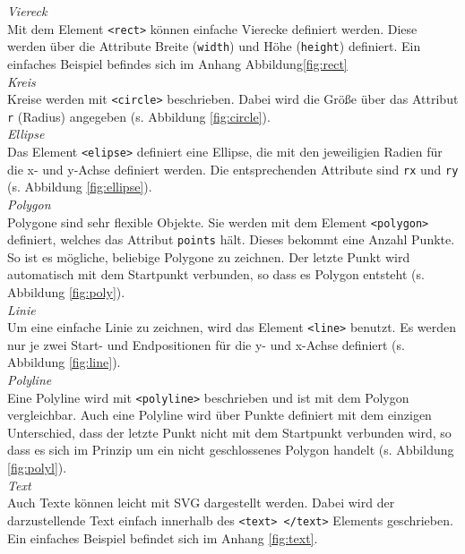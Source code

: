 \emph{Viereck}\\
Mit dem Element \texttt{<rect>} können einfache Vierecke definiert werden. Diese werden über die Attribute Breite (\texttt{width}) und Höhe (\texttt{height}) definiert. Ein einfaches Beispiel befindes sich im Anhang Abbildung\ref{fig:rect}\\

\emph{Kreis}\\
Kreise werden mit \texttt{<circle>} beschrieben. Dabei wird die Größe über das Attribut \texttt{r} (Radius) angegeben (s. Abbildung \ref{fig:circle}).\\

\emph{Ellipse}\\
Das Element \texttt{<elipse>} definiert eine Ellipse, die mit den jeweiligien Radien für die x- und y-Achse definiert werden. Die entsprechenden Attribute sind \texttt{rx} und \texttt{ry} (s. Abbildung \ref{fig:ellipse}).\\

\emph{Polygon}\\
Polygone sind sehr flexible Objekte. Sie werden mit dem Element \texttt{<polygon>} definiert, welches das Attribut \texttt{points} hält. Dieses bekommt eine Anzahl Punkte. So ist es mögliche, beliebige Polygone zu zeichnen. Der letzte Punkt wird automatisch mit dem Startpunkt verbunden, so dass es Polygon entsteht (s. Abbildung \ref{fig:poly}).\\

\emph{Linie}\\
Um eine einfache Linie zu zeichnen, wird das Element \texttt{<line>} benutzt. Es werden nur je zwei Start- und Endpositionen für die y- und x-Achse definiert (s. Abbildung \ref{fig:line}).\\

\emph{Polyline}\\
Eine Polyline wird mit \texttt{<polyline>} beschrieben und ist mit dem Polygon vergleichbar. Auch eine Polyline wird über Punkte definiert mit dem einzigen Unterschied, dass der letzte Punkt nicht mit dem Startpunkt verbunden wird, so dass es sich im Prinzip um ein nicht geschlossenes Polygon handelt (s. Abbildung \ref{fig:polyl}).\\

\emph{Text}\\
Auch Texte können leicht mit SVG dargestellt werden. Dabei wird der darzustellende Text einfach innerhalb des \texttt{<text> </text>} Elements geschrieben. Ein einfaches Beispiel befindet sich im Anhang \ref{fig:text}.

\newpage
